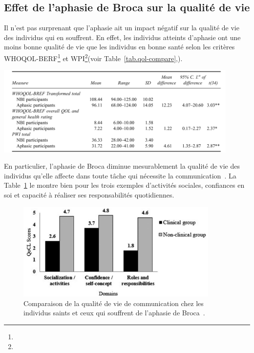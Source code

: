 \subsection{Effet de l'aphasie de Broca sur la qualité de vie}

Il n'est pas surprenant que l'aphasie ait un impact négatif sur la qualité de vie des individus qui en souffrent.
En effet, les individus atteints d'aphasie ont une moins bonne qualité de vie que les individus en bonne santé
selon les critères WHOQOL-BERF\footnote{} 
et WPI\footnote{}(voir Table~\ref{tab.qol-compare},).

\begin{table}[hbt]
    \centering
    \includegraphics[width=12cm]{assets/images/qol.png}
    \caption[Comparaison de la qualité de vie chez les individus saints et ceux qui souffrent d'une aphasie.]%
    {Comparaison de la qualité de vie chez les individus saints et ceux qui souffrent d'une aphasie~\cite{Ross_Wertz_2010}.}
    \label{tab.qol-compare}
\end{table}



En particulier, l'aphasie de Broca diminue mesurablement la qualité de vie des individus qu'elle affecte
dans toute tâche qui nécessite la communication~\cite{Pallavi_Perumal_Krupa_2018}. 
La Table~\ref{fig.qocl-compare} le montre bien pour les trois exemples d'activités sociales, confiances en soi
et capacité à réaliser ses responsabilités quotidiennes.

\begin{figure}[hbt]
    \centering
    \includegraphics[width=10cm]{assets/images/qocl.png}
    \caption[Comparaison de la qualité de vie de communication chez les individus saints et ceux qui souffrent de l'aphasie de Broca.]%
    {Comparaison de la qualité de vie de communication chez les individus saints et ceux qui souffrent de l'aphasie de Broca~\cite{Pallavi_Perumal_Krupa_2018}.}
    \label{fig.qocl-compare}
\end{figure}

